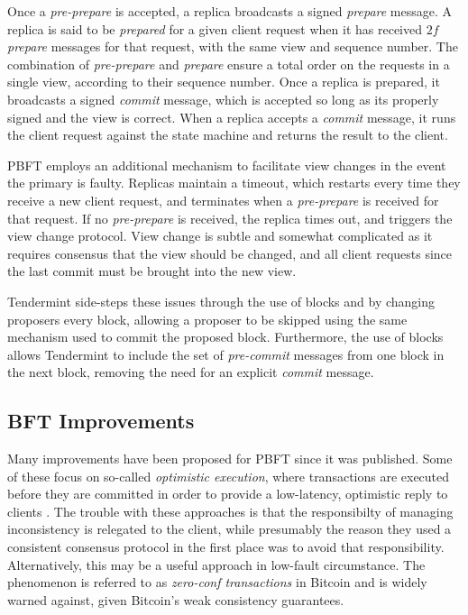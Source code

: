 Once a \emph{pre-prepare} is accepted, a replica broadcasts a signed \emph{prepare} message.
A replica is said to be \emph{prepared} for a given client request when it has received $2f$ \emph{prepare}
messages for that request, with the same view and sequence number.
The combination of \emph{pre-prepare} and \emph{prepare} ensure a total order on the requests in a single view,
according to their sequence number. 
Once a replica is prepared, it broadcasts a signed \emph{commit} message,
which is accepted so long as its properly signed and the view is correct.
When a replica accepts a \emph{commit} message, it runs the client request against the state machine and returns the result to the client.

PBFT employs an additional mechanism to facilitate view changes in the event the primary is faulty.
Replicas maintain a timeout, which restarts every time they receive a new client request, 
and terminates when a \emph{pre-prepare} is received for that request.
If no \emph{pre-prepare} is received, the replica  times out, and triggers the view change protocol.
View change is subtle and somewhat complicated as it requires consensus that the view should be changed, 
and all client requests since the last commit must be brought into the new view.

Tendermint side-steps these issues through the use of blocks and by changing proposers every block,
allowing a proposer to be skipped using the same mechanism used to commit the proposed block.
Furthermore, the use of blocks allows Tendermint to include the set of \emph{pre-commit} 
messages from one block in the next block, removing the need for an explicit \emph{commit} message.

\subsection{BFT Improvements} 

Many improvements have been proposed for PBFT since it was published.
Some of these focus on so-called \emph{optimistic execution}, 
where transactions are executed before they are committed in order to provide a low-latency,
optimistic reply to clients \cite{kotla2007zyzzyva,garcia2011efficient}.
The trouble with these approaches is that the responsibilty of managing inconsistency is relegated to the client,
while presumably the reason they used a consistent consensus protocol in the first place was to avoid that responsibility.
Alternatively, this may be a useful approach in low-fault circumstance.
The phenomenon is referred to as \emph{zero-conf transactions} in Bitcoin and is widely warned against,
given Bitcoin's weak consistency guarantees.

